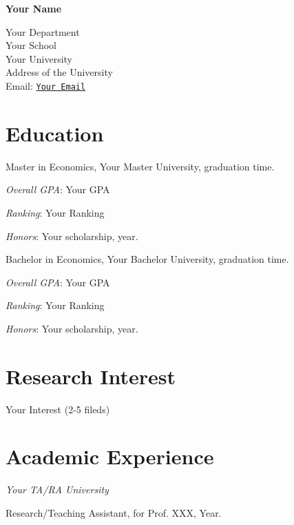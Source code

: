 \documentclass[letterpaper]{article}
\def\name{Your Name}
\renewenvironment{itemize}{
  \begin{list}{}{
    \setlength{\leftmargin}{1em}
  }
}{
  \end{list}
}
\begin{document}
\centerline{\huge\bf \name}
\vspace{0.25in}
\begin{minipage}[t]{0.8\textwidth}
Your Department\\
Your School\\
Your University\\
Address of the University\\
Email: \href{mailto:you@you.com}{\tt Your Email}\\
\end{minipage}

\section*{Education}
\begin{itemize}
\item Master in Economics, Your Master University, graduation time.
    \begin{itemize}
    \item \textit{Overall GPA}: Your GPA
    \item \textit{Ranking}: Your Ranking
    \item \textit{Honors}: Your scholarship, year.
    \end{itemize}
\item Bachelor in Economics, Your Bachelor University, graduation time.
    \begin{itemize}
    \item \textit{Overall GPA}: Your GPA
    \item \textit{Ranking}: Your Ranking
    \item \textit{Honors}: Your scholarship, year.
    \end{itemize}
\end{itemize}

\section*{Research Interest}
Your Interest (2-5 fileds)

\section*{Academic Experience}
\begin{itemize}
\item \emph{Your TA/RA University}
\begin{itemize}
\item Research/Teaching  Assistant,
  for Prof. XXX,
  Year.
\end{itemize}
\end{itemize}
\end{document}
